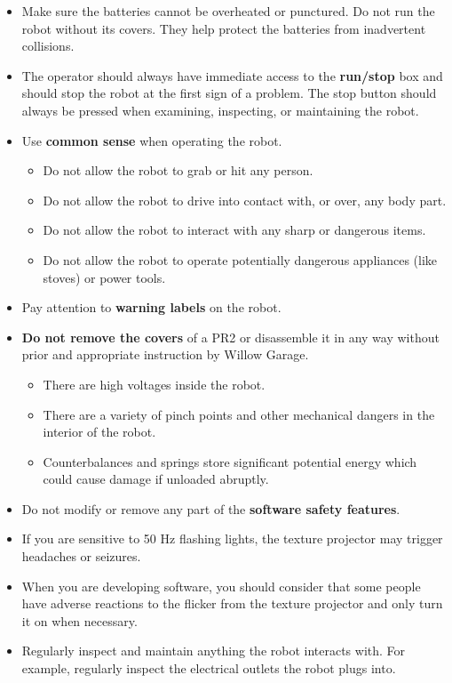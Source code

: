 \begin{itemize}
\item Make sure the batteries cannot be overheated or punctured.  Do not run the robot without its covers. They help protect the batteries from inadvertent collisions.
\item The operator should always have immediate access to the {\bf run/stop} box and should stop the robot at the first sign of a problem. The stop button should always be pressed when examining, inspecting, or maintaining the robot.
\item Use {\bf common sense} when operating the robot.
\begin{itemize}
\item Do not allow the robot to grab or hit any person.
\item Do not allow the robot to drive into contact with, or over, any body part.
\item Do not allow the robot to interact with any sharp or dangerous items.
\item Do not allow the robot to operate potentially dangerous appliances (like stoves) or power tools.
\end{itemize}
\item Pay attention to {\bf warning labels} on the robot.
\item {\bf Do not remove the covers} of a PR2 or disassemble it in any way without prior and appropriate instruction by Willow Garage.
\begin{itemize}
\item There are high voltages inside the robot.
\item There are a variety of pinch points and other mechanical dangers in the interior of the robot.
\item Counterbalances and springs store significant potential energy which could cause damage if unloaded abruptly.
\end{itemize}
\item Do not modify or remove any part of the {\bf software safety features}.
\item If you are sensitive to 50 Hz flashing lights, the texture projector may trigger headaches or seizures.
\item When you are developing software, you should consider that some people have adverse reactions to the flicker from the texture projector and only turn it on when necessary.
\item Regularly inspect and maintain anything the robot interacts with.  For example, regularly inspect the electrical outlets the robot plugs into.

\end{itemize}
